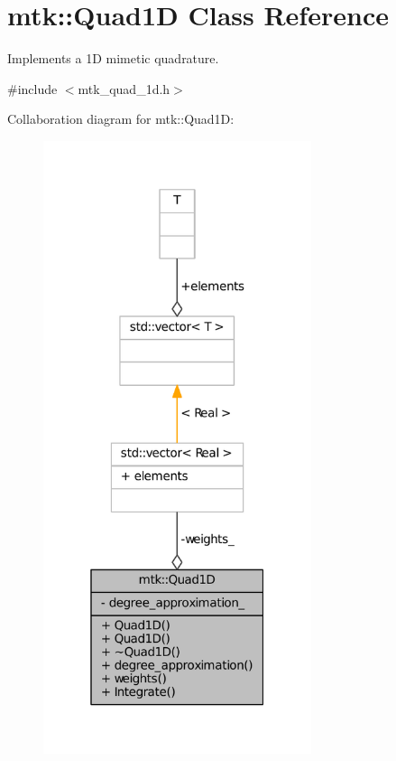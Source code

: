 \hypertarget{classmtk_1_1Quad1D}{\section{mtk\+:\+:Quad1\+D Class Reference}
\label{classmtk_1_1Quad1D}
}


Implements a 1\+D mimetic quadrature.  




{\ttfamily \#include $<$mtk\+\_\+quad\+\_\+1d.\+h$>$}



Collaboration diagram for mtk\+:\+:Quad1\+D\+:\nopagebreak
\begin{figure}[H]
\begin{center}
\leavevmode
\includegraphics[width=223pt]{classmtk_1_1Quad1D__coll__graph}
\end{center}
\end{figure}
